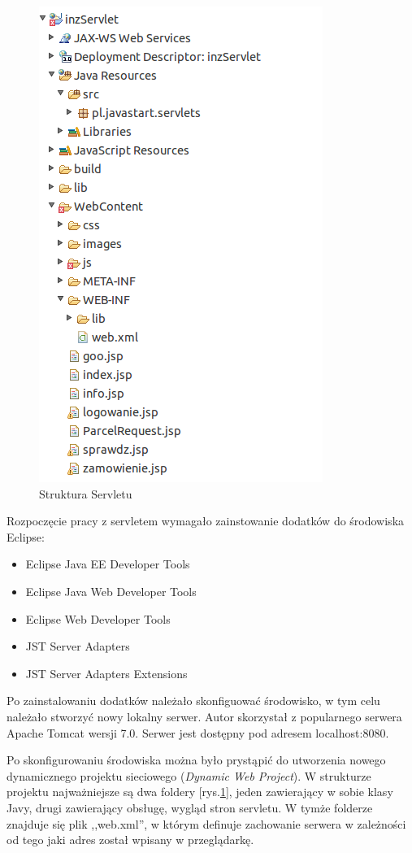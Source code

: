 \documentclass[eng,printmode,oneside]{mgr}
\begin{document}
\begin{figure}
\centering
\captionsetup{justification=centering,margin=0cm}
\vspace{-10pt}
\begin{center}
\includegraphics[width=.3\textwidth]{strukturaServlet.png}
\end{center}
\vspace{-10pt}
  \caption{Struktura Servletu}
\vspace{-60pt}
\label{servlet}
\end{figure}

Rozpoczęcie pracy z servletem wymagało zainstowanie dodatków do środowiska
Eclipse:
\begin{itemize}
  \item Eclipse Java EE Developer Tools
  \item Eclipse Java Web Developer Tools
  \item Eclipse Web Developer Tools
  \item JST Server Adapters
  \item JST Server Adapters Extensions
\end{itemize}
Po zainstalowaniu dodatków należało skonfiguować środowisko, w tym celu należało
stworzyć nowy lokalny serwer. Autor skorzystał z popularnego serwera Apache
Tomcat wersji 7.0. Serwer jest dostępny pod adresem localhost:8080. 

Po skonfigurowaniu środowiska można było prystąpić do utworzenia nowego
dynamicznego projektu sieciowego (\textsl{Dynamic Web Project}). W strukturze
projektu najważniejsze są dwa foldery [rys.\ref{servlet}], jeden zawierający w
sobie klasy Javy, drugi zawierający obsługę, wygląd stron servletu. W tymże
folderze znajduje się plik ,,web.xml'', w którym definuje zachowanie serwera w
zależności od tego jaki adres został wpisany w przeglądarkę. 
\end{document}
